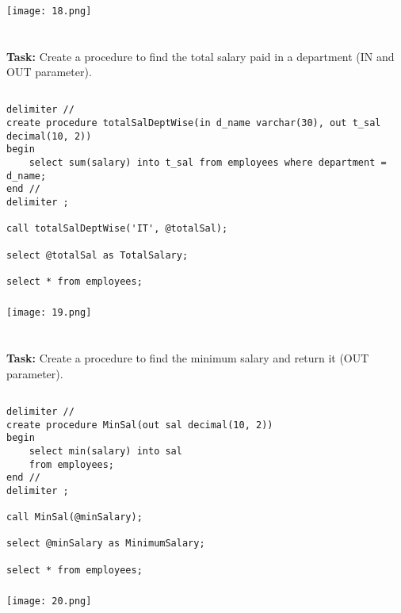 \documentclass[12pt,a4paper]{article}
\begin{document}
\subsubsection{}
\begin{center}
    \texttt{[image: 18.png]}
\end{center}


\section{}
\textbf{Task:} Create a procedure to find the total salary paid in a department (IN and OUT
parameter).

\subsection{}
\begin{lstlisting}
delimiter //
create procedure totalSalDeptWise(in d_name varchar(30), out t_sal decimal(10, 2))
begin
	select sum(salary) into t_sal from employees where department = d_name;
end //
delimiter ;

call totalSalDeptWise('IT', @totalSal);

select @totalSal as TotalSalary;

select * from employees;
\end{lstlisting}

\subsubsection{}
\begin{center}
    \texttt{[image: 19.png]}
\end{center}


\section{}
\textbf{Task:} Create a procedure to find the minimum salary and return it (OUT parameter).

\subsection{}
\begin{lstlisting}
delimiter //
create procedure MinSal(out sal decimal(10, 2))
begin
	select min(salary) into sal
    from employees;
end //
delimiter ;

call MinSal(@minSalary);

select @minSalary as MinimumSalary;

select * from employees;
\end{lstlisting}

\subsubsection{}
\begin{center}
    \texttt{[image: 20.png]}
\end{center}
\end{document}
